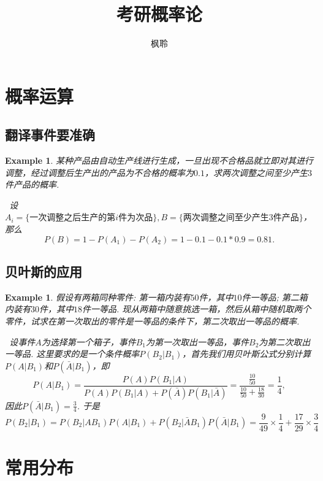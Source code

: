 \documentclass{article}
\newtheorem{example}[theorem]{Example}
\newcommand{\hints}{{\color{blue} \text{hints}}}
\begin{document}
\title{考研概率论}
\author{枫聆}
\maketitle

\tableofcontents

\newpage
\section{概率运算}

\subsection{翻译事件要准确}

\begin{example}
\rm 某种产品由自动生产线进行生成，一旦出现不合格品就立即对其进行调整，经过调整后生产出的产品为不合格的概率为$0.1$，求两次调整之间至少产生$3$件产品的概率. 

\hints\ 设$A_i = \{\text{一次调整之后生产的第$i$件为次品}\}, B=\{\text{两次调整之间至少产生$3$件产品}\}$，那么
$$
P(B) =  1- P(A_1) - P(A_2) = 1-0.1-0.1*0.9 = 0.81. 
$$
\end{example}

\subsection{贝叶斯的应用}

\begin{example}
\rm 假设有两箱同种零件: 第一箱内装有$50$件，其中$10$件一等品; 第二箱内装有$30$件，其中$18$件一等品. 现从两箱中随意挑选一箱，然后从箱中随机取两个零件，试求在第一次取出的零件是一等品的条件下，第二次取出一等品的概率.

\hints\ 设事件$A$为选择第一个箱子，事件$B_1$为第一次取出一等品，事件$B_2$为第二次取出一等品. 这里要求的是一个条件概率$P(B_2|B_1)$，首先我们用贝叶斯公式分别计算$P(A|B_1)$和$P(\bar{A}|B_1)$，即
$$
P(A|B_1) = \frac{P(A)P(B_1|A)}{P(A)P(B_1|A) + P(\bar{A})P(B_1|\bar{A})} = \frac{\frac{10}{50}}{\frac{10}{50} + \frac{18}{30}} = \frac{1}{4},
$$ 
因此$P(\bar{A}|B_1) = \frac{3}{4}$. 于是
$$
P(B_2|B_1) = P(B_2|AB_1)P(A|B_1) + P(B_2|\bar{A}B_1)P(\bar{A}|B_1) = \frac{9}{49}\times\frac{1}{4} + \frac{17}{29} \times \frac{3}{4}
$$
\end{example}

\newpage
\section{常用分布}
\end{document}
